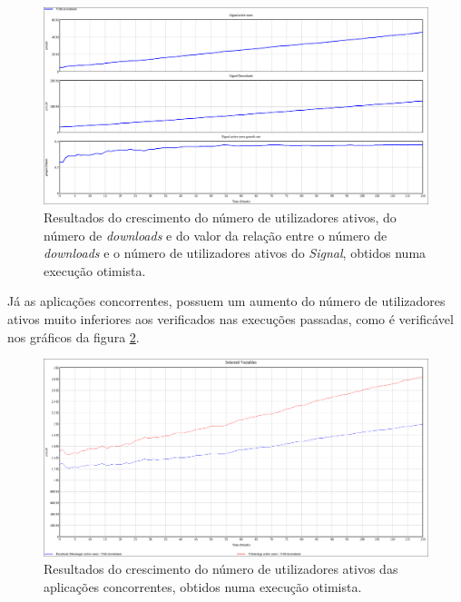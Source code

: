 \begin{figure}[H]
   \begin{center}
       \includegraphics[width=17cm]{img/optimistic_model_signal.png}
       \caption{Resultados do crescimento do número de utilizadores ativos, do número de \textit{downloads} e do valor da relação entre o número de \textit{downloads} e o número de utilizadores ativos do \textit{Signal}, obtidos numa execução otimista.}
       \label{model:optimistic_signal_model}
   \end{center}
\end{figure}

Já as aplicações concorrentes, possuem um aumento do número de utilizadores ativos muito inferiores aos verificados nas execuções passadas, como é verificável nos gráficos da figura \ref{model:optimist_others_model}.

\begin{figure}[H]
   \begin{center}
       \includegraphics[width=17cm]{img/optimist_model_others.png}
       \caption{Resultados do crescimento do número de utilizadores ativos das aplicações concorrentes, obtidos numa execução otimista.}
       \label{model:optimist_others_model}
   \end{center}
\end{figure}
